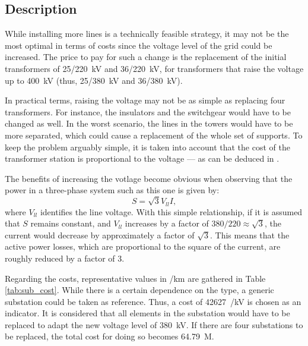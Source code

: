 \subsection{Description}
While installing more lines is a technically feasible strategy, it may not be the most optimal in terms of costs since the voltage level of the grid could be increased. The price to pay for such a change is the replacement of the initial transformers of 25/220~kV and 36/220~kV, for transformers that raise the voltage up to 400~kV (thus, 25/380~kV and 36/380~kV).

In practical terms, raising the voltage may not be as simple as replacing four transformers. For instance, the insulators and the switchgear would have to be changed as well. In the worst scenario, the lines in the towers would have to be more separated, which could cause a replacement of the whole set of supports. To keep the problem arguably simple, it is taken into account that the cost of the transformer station is proportional to the voltage --- as can be deduced in \cite{acer}.

The benefits of increasing the votlage become obvious when observing that the power in a three-phase system such as this one is given by:
\begin{equation}
  S = \sqrt{3}V_{ll}I,
\end{equation}
where $V_{ll}$ identifies the line voltage. With this simple relationship, if it is assumed that $S$ remains constant, and $V_{ll}$ increases by a factor of $380/220\approx \sqrt{3}$, the current would decrease by approximately a factor of $\sqrt{3}$. This means that the active power losses, which are proportional to the square of the current, are roughly reduced by a factor of 3. 

Regarding the costs, representative values in \texteuro/km are gathered in Table \ref{tab:sub_cost}. While there is a certain dependence on the type, a generic substation could be taken as reference. Thus, a cost of 42627~\texteuro/kV is chosen as an indicator. It is considered that all elements in the substation would have to be replaced to adapt the new voltage level of 380~kV. If there are four substations to be replaced, the total cost for doing so becomes 64.79~M\texteuro. 

